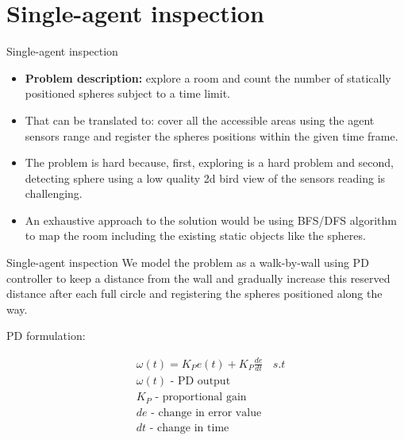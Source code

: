 \documentclass[10pt]{beamer}
\begin{document}
\section{Single-agent inspection}
\begin{frame}{Single-agent inspection}
\begin{itemize}
    \item {\bf Problem description:} explore a room and count the number of statically positioned spheres subject to a time limit. 
    \item That can be translated to: cover all the accessible areas using the agent sensors range and register the spheres positions within the given time frame.
    \item The problem is hard because, first, exploring is a hard problem and second, detecting sphere using a low quality 2d bird view of the sensors reading is challenging.
    \item An exhaustive approach to the solution would be using BFS/DFS algorithm to map the room including the existing static objects like the spheres.
\end{itemize}
\end{frame}

\begin{frame}{Single-agent inspection}
    We model the problem as a walk-by-wall using PD controller to keep a distance from the wall and gradually increase this reserved distance after each full circle and registering the spheres positioned along the way.
    
    PD formulation:

\begin{align*} 
&\omega(t)=K_{P} e(t)+K_{P} \frac{d e}{d t}\ \ \ \ s.t\\
&\omega(t)\text{ - PD output }\\
&K_{P}\text{ - proportional gain }\\
&de\text{ - change in error value }\\
&dt\text{ - change in time } 
\end{align*}    

\end{frame}
\end{document}
